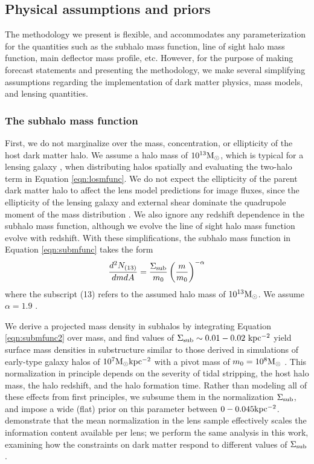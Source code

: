 \subsection{Physical assumptions and priors}
\label{ssec:assumptionsandpriors}
The methodology we present is flexible, and accommodates any parameterization for the quantities such as the subhalo mass function, line of sight halo mass function, main deflector mass profile, etc. However, for the purpose of making forecast statements and presenting the methodology, we make several simplifying assumptions regarding the implementation of dark matter physics, mass models, and lensing quantities. 

\subsubsection{The subhalo mass function}
First, we do not marginalize over the mass, concentration, or ellipticity of the host dark matter halo. We assume a halo mass of $10^{13}{\rm{M}_{\odot}}$, which is typical for a lensing galaxy \cite{Gavazzi++07}, when distributing halos spatially and evaluating the two-halo term in Equation \ref{eqn:losmfunc}. We do not expect the ellipticity of the parent dark matter halo to affect the lens model predictions for image fluxes, since the ellipticity of the lensing galaxy and external shear dominate the quadrupole moment of the mass distribution \cite{Keeton++97}. We also ignore any redshift dependence in the subhalo mass function, although we evolve the line of sight halo mass function evolve with redshift. With these simplifications, the subhalo mass function in Equation \ref{eqn:submfunc} takes the form 
\begin{equation}
\label{eqn:submfunc2}
\frac{d^2N_{(13)}}{dmdA} = \frac{\Sigma_{\rm{sub}}}{m_0} \left(\frac{m}{m_0}\right)^{-\alpha} 
\end{equation}
where the subscript (13) refers to the assumed halo mass of $10^{13} {\rm{M}_{\odot}}$.  We assume $\alpha = 1.9$ \cite{Springel++08,Fiacconi++16}. 

We derive a projected mass density in subhalos by integrating Equation \ref{eqn:submfunc2} over mass, and find values of $\Sigma_{\rm{sub}} \sim 0.01-0.02 \ \rm{kpc^{-2}}$ yield surface mass densities in substructure similar to those derived in simulations of early-type galaxy halos of $10^7 {\rm{M}_{\odot}} \rm{kpc^{-2}}$ with a pivot mass of $m_0 = 10^{8} {\rm{M}_{\odot}}$ \cite{Fiacconi++16}. This normalization in principle depends on the severity of tidal stripping, the host halo mass, the halo redshift, and the halo formation time. Rather than modeling all of these effects from first principles, we subsume them in the normalization $\Sigma_{\rm{sub}}$, and impose a wide (flat) prior on this parameter between $0-0.045 \rm{kpc^{-2}}$. \cite{Gilman++18} demonstrate that the mean normalization in the lens sample effectively scales the information content available per lens; we perform the same analysis in this work, examining how the constraints on dark matter respond to different values of $\Sigma_{\rm{sub}}$. 

